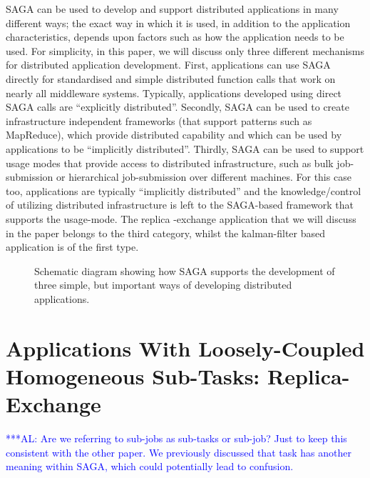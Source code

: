 \documentclass[conference,final]{IEEEtran}
\newcommand{\up}{\vspace*{-1em}}
\newcommand{\alnote}[1]{ {\textcolor{blue} { ***AL: #1 }}}
\newcommand{\alnote}[1]{}
\begin{document}
SAGA can be used to develop and support distributed applications in
many different ways; the exact way in which it is used, in addition to
the application characteristics, depends upon factors such as how the
application needs to be used. For simplicity, in this paper, we will
discuss only three different mechanisms for distributed application
development.  First, applications can use SAGA directly for
standardised and simple distributed function calls that work on nearly
all middleware systems. Typically, applications developed using direct
SAGA calls are ``explicitly distributed''.  Secondly, SAGA can be used
to create infrastructure independent frameworks (that support patterns
such as MapReduce), which provide distributed capability and which can
be used by applications to be ``implicitly distributed''. Thirdly, SAGA
can be used to support usage modes that provide access to distributed
infrastructure, such as bulk job-submission or hierarchical
job-submission over different machines. For this case too,
applications are typically ``implicitly distributed'' and the
knowledge/control of utilizing distributed infrastructure is left to
the SAGA-based framework that supports the usage-mode. The replica
-exchange application that we will discuss in the paper belongs to the
third category, whilst the kalman-filter based application is of the
first type.

\up
\begin{figure}[!h]
  \begin{center}
  \end{center}
  \caption{Schematic diagram showing how SAGA supports the development
    of three simple, but important ways of developing distributed
    applications. \up \up}
  \label{sagalayer}
\end{figure}


\section{Applications With Loosely-Coupled Homogeneous
  Sub-Tasks: Replica-Exchange}  
\up 
\alnote{Are we referring to sub-jobs as sub-tasks or sub-job? Just to
  keep this consistent with the other paper. We previously discussed
  that task has another meaning within SAGA, which could potentially
  lead to confusion.}
  
\end{document}
